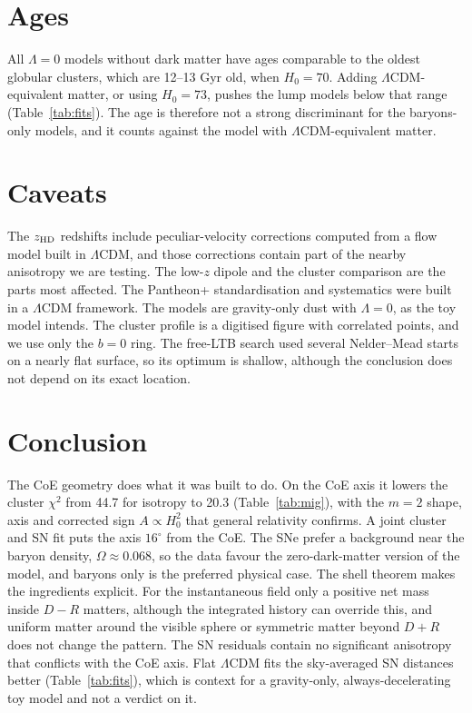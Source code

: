 \documentclass[10pt,twocolumn,letterpaper]{article}
\begin{document}
\section{Ages}
All $\Lambda=0$ models without dark matter have ages comparable to the oldest globular clusters, which are 12--13 Gyr old, when $H_0=70$. Adding $\Lambda$CDM-equivalent matter, or using $H_0=73$, pushes the lump models below that range (Table~\ref{tab:fits}). The age is therefore not a strong discriminant for the baryons-only models, and it counts against the model with $\Lambda$CDM-equivalent matter.


\section{Caveats}
The $z_{\rm HD}$ redshifts include peculiar-velocity corrections computed from a flow model built in $\Lambda$CDM, and those corrections contain part of the nearby anisotropy we are testing. The low-$z$ dipole and the cluster comparison are the parts most affected. The Pantheon+ standardisation and systematics were built in a $\Lambda$CDM framework. The models are gravity-only dust with $\Lambda=0$, as the toy model intends. The cluster profile is a digitised figure with correlated points, and we use only the $b=0$ ring. The free-LTB search used several Nelder--Mead starts on a nearly flat surface, so its optimum is shallow, although the conclusion does not depend on its exact location.


\section{Conclusion}
The CoE geometry does what it was built to do. On the CoE axis it lowers the cluster $\chi^2$ from 44.7 for isotropy to 20.3 (Table~\ref{tab:mig}), with the $m=2$ shape, axis and corrected sign $A\propto H_0^2$ that general relativity confirms. A joint cluster and SN fit puts the axis $16^\circ$ from the CoE. The SNe prefer a background near the baryon density, $\Omega\approx0.068$, so the data favour the zero-dark-matter version of the model, and baryons only is the preferred physical case. The shell theorem makes the ingredients explicit. For the instantaneous field only a positive net mass inside $D-R$ matters, although the integrated history can override this, and uniform matter around the visible sphere or symmetric matter beyond $D+R$ does not change the pattern. The SN residuals contain no significant anisotropy that conflicts with the CoE axis. Flat $\Lambda$CDM fits the sky-averaged SN distances better (Table~\ref{tab:fits}), which is context for a gravity-only, always-decelerating toy model and not a verdict on it.
\end{document}
